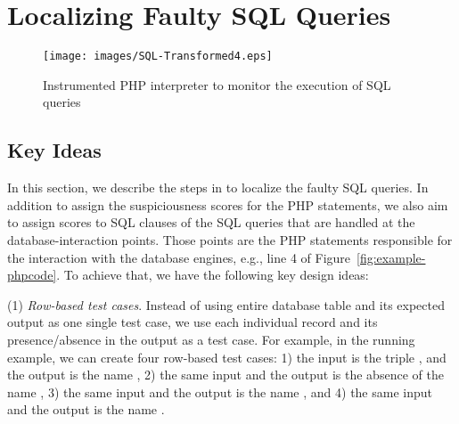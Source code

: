 \section{Localizing Faulty SQL Queries}


\begin{figure}[tbp]
  \centering
  \texttt{[image: images/SQL-Transformed4.eps]} %
 \caption{Instrumented PHP interpreter to monitor the execution of SQL queries~\cite{icsm13}}\label{fig:SQL-Transformed}
\end{figure}

\subsection{Key Ideas}

In this section, we describe the steps in {\tool} to localize the
faulty SQL queries. In addition to assign the suspiciousness scores
for the PHP statements, we also aim to assign scores to SQL
 clauses of the SQL queries that are handled at the
database-interaction points. Those points are the PHP statements
responsible for the interaction with the database engines, e.g., line
4 of Figure~\ref{fig:example-phpcode}.  To achieve that, we have the
following key design ideas:




(1) {\em Row-based test cases}. Instead of using entire database table
and its expected output as one single test case, we use each
individual record and its presence/absence in the output as a test
case. For example, in the running example, we can create four
row-based test cases: 1) the input is the triple , and the output is the name
, 2) the same input and the output is the absence of the
name , 3) the same input and the output is the name
, and 4) the same input and the output is the name
.

